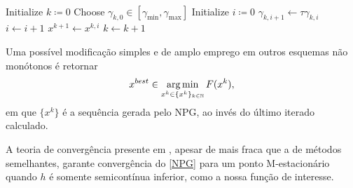 \begin{algorithm}[H]
\caption{\textit{Nonmonotone Proximal Gradient method} (NPG)}
\label{NPG}
        \\
        \begin{algorithmic}[1]
        \State Initialize $k\coloneqq 0$
        \Repeat
            \State Choose $\gamma_{k,0}\in [\gamma_{\min}, \gamma_{\max}]$
            \State Initialize $i\coloneqq 0$
                \State$\gamma_{k,i+1}\gets\tau \gamma_{k,i}$
                \State$i\gets i+1$
            \EndWhile
        \State $x^{k+1}\gets x^{k,i}$
        \State $k\gets k+1$
    \end{algorithmic}
\end{algorithm}

Uma possível modificação simples e de amplo emprego em outros esquemas não monótonos é retornar
\begin{equation}
\label{eq:xbest}x^{best}\in \operatorname*{arg\,min}_{x^k\in\{x^k\}_{k\in\mathbb{N}}}{F(x^k)},
\end{equation}
em que $\{x^k\}$ é a sequência gerada pelo NPG, ao invés do último iterado calculado.

A teoria de convergência presente em \cite{kanzow2021}, apesar de mais fraca que a de métodos semelhantes, garante convergência do \autoref{NPG} para um ponto M-estacionário quando $h$ é somente semicontínua inferior, como a nossa função de interesse. 

